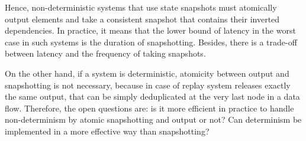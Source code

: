 Hence, non-deterministic systems that use state snapshots must atomically output elements and take a consistent snapshot that contains their inverted dependencies. In practice, it means that the lower bound of latency in the worst case in such systems is the duration of snapshotting. Besides, there is a trade-off between latency and the frequency of taking snapshots.

On the other hand, if a system is deterministic, atomicity between output and snapshotting is not necessary, because in case of replay system releases exactly the same output, that can be simply deduplicated at the very last node in a data flow. Therefore, the open questions are: is it more efficient in practice to handle non-determinism by atomic snapshotting and output or not? Can determinism be implemented in a more effective way than snapshotting?